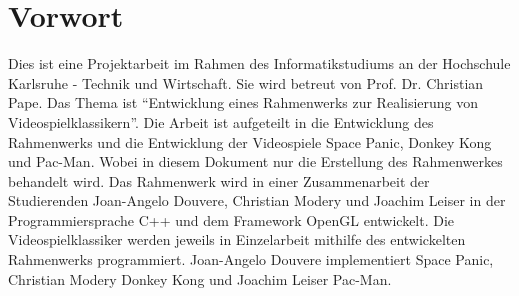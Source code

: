 \section{Vorwort} %

Dies ist eine Projektarbeit im Rahmen des Informatikstudiums an der Hochschule Karlsruhe - Technik und Wirtschaft. Sie wird betreut von Prof. Dr. Christian Pape. Das Thema ist "`Entwicklung eines Rahmenwerks zur Realisierung von Videospielklassikern"'. Die Arbeit ist aufgeteilt in die Entwicklung des Rahmenwerks und die Entwicklung der Videospiele Space Panic, Donkey Kong und Pac-Man. Wobei in diesem Dokument nur die Erstellung des Rahmenwerkes behandelt wird. Das Rahmenwerk wird in einer Zusammenarbeit der Studierenden Joan-Angelo Douvere, Christian Modery und Joachim Leiser in der Programmiersprache C++ und dem Framework OpenGL entwickelt. Die Videospielklassiker werden jeweils in Einzelarbeit mithilfe des entwickelten Rahmenwerks programmiert. Joan-Angelo Douvere implementiert Space Panic, Christian Modery Donkey Kong und Joachim Leiser Pac-Man. 